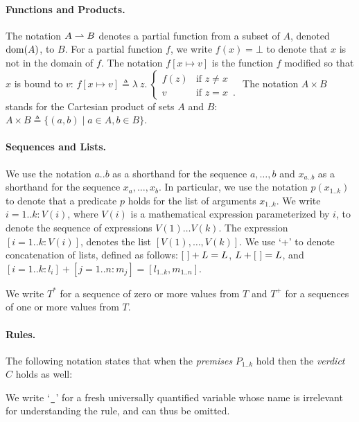 \paragraph{Functions and Products.}
The notation $A \partialto B$ denotes a partial function from a subset of $A$, denoted $\dom(A)$, to $B$.
For a partial function $f$, we write $f(x) = \bot$ to denote that $x$ is not in the domain of $f$.
%
The notation $f[x \mapsto v]$ is the function $f$ modified so that $x$ is bound
to $v$: $f[x \mapsto v] \triangleq \lambda\ z.\ \begin{cases}
  f(z) & \text{if } z \neq x\\
  v & \text{if } z = x \enspace .
\end{cases}$
%
The notation $A \times B$ stands for the Cartesian product of sets $A$ and $B$: $A \times B \triangleq \{(a,b) \;|\; a \in A, b \in B\}$.

\paragraph{Sequences and Lists.}
We use the notation $a..b$ as a shorthand for the sequence $a,\ldots,b$ and $x_{a..b}$ as a shorthand for the sequence $x_a,\ldots,x_b$.
%
In particular, we use the notation $p(x_{1..k})$ to denote that a predicate $p$ holds for the list of arguments $x_{1..k}$.
%
We write $i=1..k: V(i)$, where $V(i)$ is a mathematical expression parameterized by $i$,
to denote the sequence of expressions $V(1) \ldots V(k)$.
The expression $[i=1..k: V(i)]$, denotes the list $[V(1),\ldots,V(k)]$.
%
We use `+' to denote concatenation of lists, defined as follows: $\emptylist + L = L$, $L + \emptylist = L$, and $[i=1..k: l_i] + [j=1..n: m_j] = [l_{1..k}, m_{1..n}]$.

We write $T^*$ for a sequence of zero or more values from $T$ and $T^+$ for a sequences of one or more values from $T$.

\paragraph{Rules.}
The following notation states that when the \emph{premises} $P_{1..k}$ hold then the \emph{verdict} $C$ holds as well:
\begin{mathpar}
\end{mathpar}
%
We write `$\Ignore$' for a fresh universally quantified variable whose name is irrelevant for understanding the rule,
and can thus be omitted.
